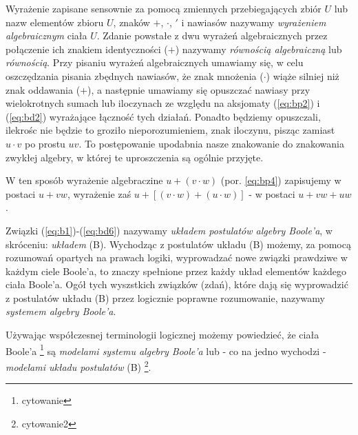 \documentclass[12 pt, a4paper, leqno]{book}
\numberwithin{equation}{section}
\begin{document}
Wyrażenie zapisane sensownie za pomocą zmiennych przebiegających zbiór $U$ lub nazw elementów zbioru $U$, znaków $+$, $\cdot$, 
$'$ i nawiasów nazywamy \textit{wyrażeniem algebraicznym} ciała $U$. Zdanie powstałe z dwu wyrażeń algebraicznych
przez połączenie ich znakiem identyczności ($+$) nazywamy \textit{równością algebraiczną} lub \textit{równością}.
Przy pisaniu wyrażeń algebraicznych umawiamy się, w celu oszczędzania pisania zbędnych nawiasów, 
że znak mnożenia ($\cdot$) wiąże silniej niż znak oddawania ($+$), a następnie umawiamy się opuszczać nawiasy 
przy wielokrotnych sumach lub iloczynach ze względu na aksjomaty (\ref{eq:bp2}) i (\ref{eq:bd2}) wyrażające łączność tych działań.
Ponadto będziemy opuszczali, ilekrośc nie będzie to groziło nieporozumieniem, znak iloczynu, pisząc zamiast $u \cdot v$
po prostu $uv$. To postępowanie upodabnia nasze znakowanie do znakowania zwykłej algebry, w której te uproszczenia 
są ogólnie przyjęte.

W ten sposób wyrażenie algebraczine $u +(v \cdot w)$ (por. \ref{eq:bp4}) zapisujemy w postaci $u+vw$, wyrażenie zaś
$u+[(v \cdot w)+(u \cdot w)]$ - w postaci $u + vw + uw$.

Związki (\ref{eq:b1})-(\ref{eq:bd6}) nazywamy \textit{układem postulatów algebry Boole'a}, w skróceniu: \textit{układem} (B).
Wychodząc z postulatów układu (B) możemy, za pomocą rozumowań opartych na prawach logiki, wyprowadzać nowe związki prawdziwe w każdym ciele Boole'a, to znaczy spełnione
przez każdy układ elementów każdego ciała Boole'a. Ogół tych wyszstkich związków (zdań), które dają się wyprowadzić
z postulatów układu (B) przez logicznie poprawne rozumowanie, nazywamy \textit{systemem algebry Boole'a}.

Używając współczesnej terminologii logicznej możemy powiedzieć, że ciała Boole'a \footnote{cytowanie} są 
\textit{modelami systemu algebry Boole'a} lub - co na jedno wychodzi - \textit{modelami układu postulatów} (B) \footnote{cytowanie2}.
\end{document}
